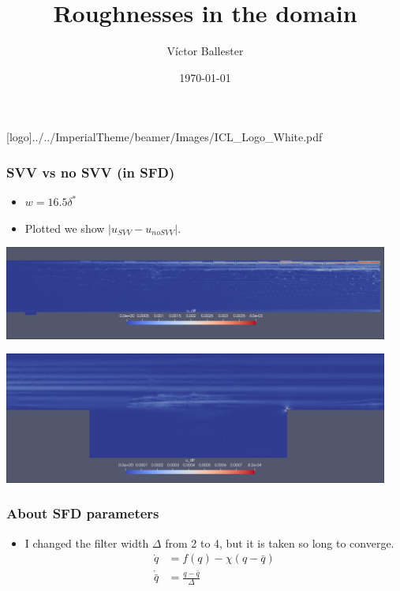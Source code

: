 \documentclass[
  aspectratio=169, %
  t, %
  onlytextwidth, %
  10pt, %
]{beamer}
\title{Roughnesses in the domain} %
\subtitle{} %
\author{Víctor Ballester} %
\date{\today} %
\def\imagefolder{../../ImperialTheme/beamer/Images}
\begin{document}
\begingroup
{} %
[logo]{\imagefolder/ICL_Logo_White.pdf} %
\frame[plain, s]{\titlepage} %
\endgroup

\begin{frame}
  \frametitle{SVV vs no SVV (in SFD)}
  \begin{itemize}
    \item $w = 16.5\delta^*$  
    \item Plotted we show $|u_{SVV} - u_{no SVV}|$.
  \end{itemize}
  {
    \centering
    \includegraphics[width=0.95\textwidth]{Images/svv_full.png}
  }
\end{frame}
\begin{frame}
  {
    \centering
    \includegraphics[width=0.95\textwidth]{Images/svv_gap.png}
  }
\end{frame}
\begin{frame}
  \frametitle{About SFD parameters}
  \begin{itemize}
  	\item I changed the filter width $\Delta$ from 2 to 4, but it is taken so long to converge. 
	  \begin{align*}
	    \dot{q} &= f(q) -\chi (q-\bar{q})\\
	    \dot{\bar{q}} &= \frac{q-\bar{q}}{\Delta}
	  \end{align*}
  \end{itemize}
\end{frame}
\end{document}
